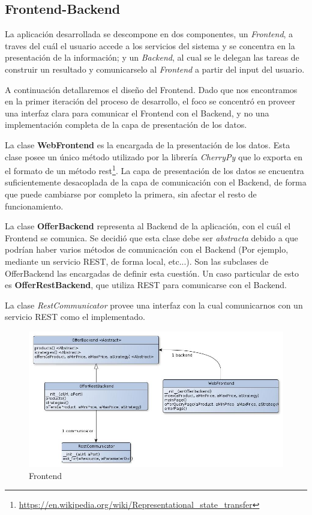 \documentclass[10pt, a4paper]{article}
\begin{document}
\subsection{Frontend-Backend}

La aplicación desarrollada se descompone en dos componentes, un \emph{Frontend}, a traves del cuál el usuario accede a los servicios del sistema y se concentra en la presentación de la información; y un \emph{Backend}, al cual se le delegan las tareas de construir un resultado y comunicarselo al \emph{Frontend} a partir del input del usuario.
  
A continuación detallaremos el diseño del Frontend. Dado que nos encontramos en la primer iteración del proceso de desarrollo, el foco se concentró en proveer una interfaz clara para comunicar el Frontend con el Backend, y no una implementación completa de la capa de presentación de los datos.

La clase \textbf{WebFrontend} es la encargada de la presentación de los datos. Esta clase posee un único método utilizado por la librería \emph{CherryPy} que lo exporta en el formato de un método \textsf{rest}\footnote{\url{https://en.wikipedia.org/wiki/Representational\_state\_transfer}}. La capa de presentación de los datos se encuentra suficientemente desacoplada de la capa de comunicación con el Backend, de forma que puede cambiarse por completo la primera, sin afectar el resto de funcionamiento.

La clase \textbf{OfferBackend} representa al Backend de la aplicación, con el cuál el Frontend se comunica. Se decidió que esta clase debe ser \emph{abstracta} debido a que podrían haber varios métodos de comunicación con el Backend (Por ejemplo, mediante un servicio REST, de forma local, etc...). Son las subclases de OfferBackend las encargadas de definir esta cuestión. Un caso particular de esto es \textbf{OfferRestBackend}, que utiliza REST para comunicarse con el Backend. 

La clase \emph{RestCommunicator} provee una interfaz con la cual comunicarnos con un servicio REST como el implementado. 

\begin{figure}[H]
\centering
\includegraphics[scale=0.6]{graphics/frontend_class.jpg}
\caption{Frontend}
\end{figure}
\newpage
\end{document}
